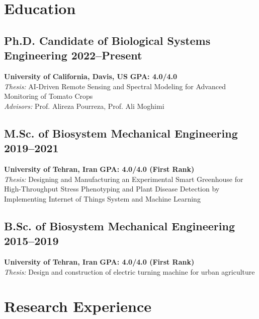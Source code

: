 \documentclass[11pt,a4paper]{article}
\begin{document}
\section{Education}

\subsection{\texorpdfstring{Ph.D. Candidate of Biological Systems Engineering \hfill 2022--Present}{Ph.D. Candidate of Biological Systems Engineering (2022--Present)}}
\textbf{University of California, Davis, US} \hfill \textcolor{ucdavisgolddark}{\textbf{GPA: 4.0/4.0}}\\
\textit{Thesis:} AI-Driven Remote Sensing and Spectral Modeling for Advanced Monitoring of Tomato Crops\\
\textit{Advisors:} Prof. Alireza Pourreza, Prof. Ali Moghimi

\subsection{\texorpdfstring{M.Sc. of Biosystem Mechanical Engineering \hfill 2019--2021}{M.Sc. of Biosystem Mechanical Engineering (2019--2021)}}
\textbf{University of Tehran, Iran} \hfill \textcolor{ucdavisgolddark}{\textbf{GPA: 4.0/4.0 (First Rank)}}\\
\textit{Thesis:} Designing and Manufacturing an Experimental Smart Greenhouse for High-Throughput Stress Phenotyping and Plant Disease Detection by Implementing Internet of Things System and Machine Learning

\subsection{\texorpdfstring{B.Sc. of Biosystem Mechanical Engineering \hfill 2015--2019}{B.Sc. of Biosystem Mechanical Engineering (2015--2019)}}
\textbf{University of Tehran, Iran} \hfill \textcolor{ucdavisgolddark}{\textbf{GPA: 4.0/4.0 (First Rank)}}\\
\textit{Thesis:} Design and construction of electric turning machine for urban agriculture

\section{Research Experience}
\end{document}
